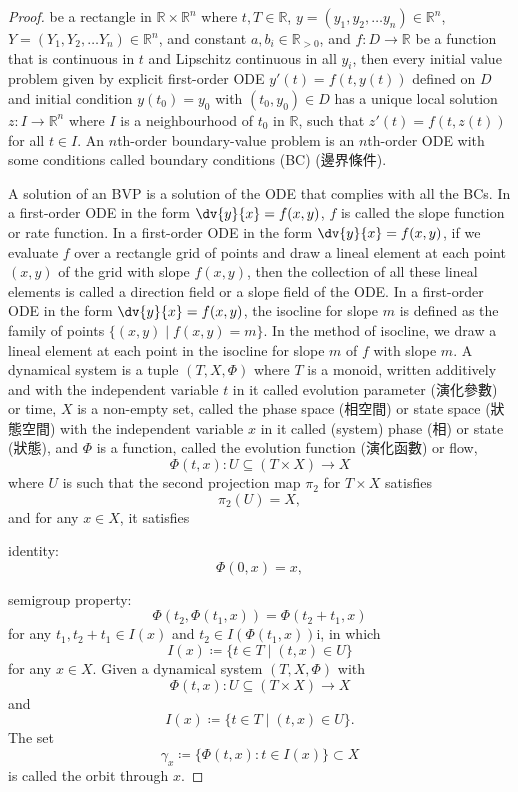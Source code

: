 \documentclass[a4paper,12pt]{report}
\begin{document}
\begin{proof}
{{{{{{be a rectangle in $\mathbb{R}\times\mathbb{R}^n$ where $t,T\in\mathbb{R}$, $y=(y_1, y_2,\ldots y_n)\in\mathbb{R}^n$, $Y=(Y_1, Y_2,\ldots Y_n)\in\mathbb{R}^n$, and constant $a,b_i\in\mathbb{R}_{>0}$, and $f\colon D\to \mathbb {R}$ be a function that is continuous in $t$ and Lipschitz continuous in all $y_i$, then every initial value problem given by explicit first-order ODE $y'(t)=f\left(t,y(t)\right)$ defined on $D$ and initial condition $y\left(t_{0}\right)=y_{0}$ with $(t_{0},y_{0})\in D$ has a unique local solution $z\colon I\to \mathbb {R}^n$ where $I$ is a neighbourhood of $t_0$ in $\mathbb {R} $, such that $z'(t)=f\left(t,z(t)\right)$ for all $t\in I$.
An $n$th-order boundary-value problem is an $n$th-order ODE with some conditions called boundary conditions (BC) (邊界條件).

A solution of an BVP is a solution of the ODE that complies with all the BCs.
In a first-order ODE in the form $\dv{y}{x}=f(x,y)$, $f$ is called the slope function or rate function.
In a first-order ODE in the form $\dv{y}{x}=f(x,y)$, if we evaluate $f$ over a rectangle grid of points and draw a lineal element at each point $(x,y)$ of the grid with slope $f(x,y)$, then the collection of all these lineal elements is called a direction field or a slope field of the ODE.
In a first-order ODE in the form $\dv{y}{x}=f(x,y)$, the isocline for slope $m$ is defined as the family of points $\{(x,y)\mid f(x,y)=m\}$. In the method of isocline, we draw a lineal element at each point in the isocline for slope $m$ of $f$ with slope $m$.
A dynamical system is a tuple $(T, X, \Phi)$ where $T$ is a monoid, written additively and with the independent variable $t$ in it called evolution parameter (演化參數) or time, $X$ is a non-empty set, called the phase space (相空間) or state space (狀態空間) with the independent variable $x$ in it called (system) phase (相) or state (狀態), and $\Phi$ is a function, called the evolution function (演化函數) or flow,
\[\Phi(t,x)\colon U\subseteq(T\times X)\to X\]
where $U$ is such that the second projection map $\pi_2$ for $T\times X$ satisfies
\[\pi_2(U)=X,\]
and for any $x \in X$, it satisfies
\bit
\item identity:
\[\Phi (0,x)=x,\]
\item semigroup property:
\[\Phi (t_{2},\Phi (t_{1},x))=\Phi (t_{2}+t_{1},x)\]
for any $t_{1},t_{2}+t_{1}\in I(x)$ and $t_{2}\in I(\Phi (t_{1},x))$i, in which
\[I(x)\coloneq\{t\in T\mid(t,x)\in U\}\]
for any $x\in X$.
\eit
{}
Given a dynamical system $(T, X, \Phi)$ with
\[\Phi(t,x)\colon U\subseteq(T\times X)\to X\]
and
\[I(x)\coloneq\{t\in T\mid(t,x)\in U\}.\]
The set
\[\gamma _{x}\coloneq\{\Phi (t,x)\colon t\in I(x)\}\subset X\]
is called the orbit through $x$.

}}}}}}
\end{proof}
\end{document}
